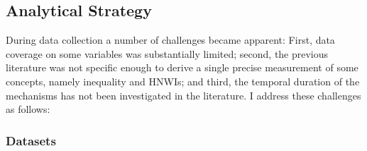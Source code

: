 \documentclass[11pt]{article}
\begin{document}
\subsection*{Analytical Strategy}


During data collection a number of challenges became apparent:
First, data coverage on some variables was substantially limited; second, the previous literature was not specific enough to derive a single precise measurement of some concepts, namely inequality and HNWIs; and third, the temporal duration of the mechanisms has not been investigated in the literature. 
I address these challenges as follows: 

\subsubsection*{Datasets}
\end{document}
